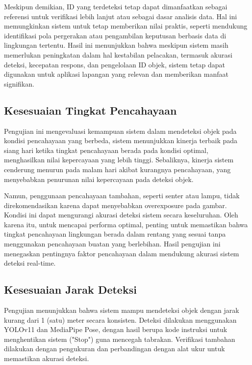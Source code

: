 Meskipun demikian, ID yang terdeteksi tetap dapat dimanfaatkan sebagai referensi untuk verifikasi lebih lanjut atau sebagai dasar analisis data. Hal ini memungkinkan sistem untuk tetap memberikan nilai praktis, seperti mendukung identifikasi pola pergerakan atau pengambilan keputusan berbasis data di lingkungan tertentu. Hasil ini menunjukkan bahwa meskipun sistem masih memerlukan peningkatan dalam hal kestabilan pelacakan, termasuk akurasi deteksi, kecepatan respons, dan pengelolaan ID objek, sistem tetap dapat digunakan untuk aplikasi lapangan yang relevan dan memberikan manfaat signifikan.

\subsection{Kesesuaian Tingkat Pencahayaan}
\label{sec:kesesuaianpencahayaan}

Pengujian ini mengevaluasi kemampuan sistem dalam mendeteksi objek pada kondisi pencahayaan yang berbeda, sistem menunjukkan kinerja terbaik pada siang hari ketika tingkat pencahayaan berada pada kondisi optimal, menghasilkan nilai kepercayaan yang lebih tinggi. Sebaliknya, kinerja sistem cenderung menurun pada malam hari akibat kurangnya pencahayaan, yang menyebabkan penurunan nilai kepercayaan pada deteksi objek.

Namun, penggunaan pencahayaan tambahan, seperti senter atau lampu, tidak direkomendasikan karena dapat menyebabkan overexposure pada gambar. Kondisi ini dapat mengurangi akurasi deteksi sistem secara keseluruhan. Oleh karena itu, untuk mencapai performa optimal, penting untuk memastikan bahwa tingkat pencahayaan lingkungan berada dalam rentang yang sesuai tanpa menggunakan pencahayaan buatan yang berlebihan. Hasil pengujian ini menegaskan pentingnya faktor pencahayaan dalam mendukung akurasi sistem deteksi real-time.

\subsection{Kesesuaian Jarak Deteksi}
\label{sec:kesesuaianjarak}

Pengujian menunjukkan bahwa sistem mampu mendeteksi objek dengan jarak kurang dari 1 (satu) meter secara konsisten. Deteksi dilakukan menggunakan YOLOv11 dan MediaPipe Pose, dengan hasil berupa kode instruksi untuk menghentikan sistem ("Stop") guna mencegah tabrakan. Verifikasi tambahan dilakukan dengan pengukuran dan perbandingan dengan alat ukur untuk memastikan akurasi deteksi.

